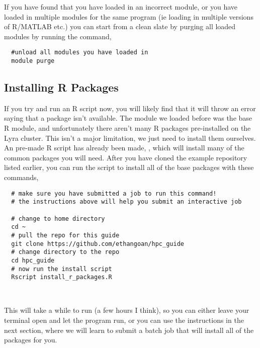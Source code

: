 If you have found that you have loaded in an incorrect module, or you have loaded in multiple modules for the same program (ie loading in multiple versions of R/MATLAB etc.) you can start from a clean slate by purging all loaded modules by running the command,
%
\\
\par
\begin{verbatim}
  #unload all modules you have loaded in
  module purge
\end{verbatim}
%
\subsection{Installing R Packages}
\label{sec:install}
If you try and run an R script now, you will likely find that it will throw an error saying that a package isn't available. The module we loaded before was the base R module, and unfortunately there aren't many R packages pre-installed on the Lyra cluster. This isn't a major limitation, we just need to install them ourselves. An pre-made R script has already been made, , which will install many of the common packages you will need. After you have cloned the example repository listed earlier, you can run the script to install all of the base packages with these commands,
\\
\par
\begin{verbatim}
  # make sure you have submitted a job to run this command!
  # the instructions above will help you submit an interactive job

  # change to home directory
  cd ~
  # pull the repo for this guide
  git clone https://github.com/ethangoan/hpc_guide
  # change directory to the repo
  cd hpc_guide
  # now run the install script
  Rscript install_r_packages.R
\end{verbatim}
%
\\
\par
%
This will take a while to run (a few hours I think), so you can either leave your terminal open and let the program run, or you can use the instructions in the next section, where we will learn to submit a batch job that will install all of the packages for you.
%
